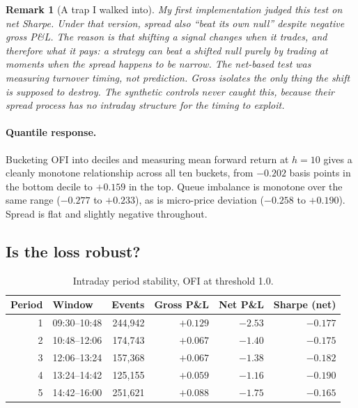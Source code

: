 \documentclass[11pt]{scrartcl}
\newtheorem{remark}{Remark}[section]
\begin{document}
\begin{remark}[A trap I walked into]
\label{rem:nulltrap}
My first implementation judged this test on \emph{net} Sharpe. Under that version, spread also ``beat its own null'' despite negative gross P\&L. The reason is that shifting a signal changes \emph{when} it trades, and therefore what it pays: a strategy can beat a shifted null purely by trading at moments when the spread happens to be narrow. The net-based test was measuring turnover timing, not prediction. Gross isolates the only thing the shift is supposed to destroy. The synthetic controls never caught this, because their spread process has no intraday structure for the timing to exploit.
\end{remark}

\paragraph{Quantile response.} Bucketing OFI into deciles and measuring mean forward return at $h=10$ gives a cleanly monotone relationship across all ten buckets, from $-0.202$ basis points in the bottom decile to $+0.159$ in the top. Queue imbalance is monotone over the same range ($-0.277$ to $+0.233$), as is micro-price deviation ($-0.258$ to $+0.190$). Spread is flat and slightly negative throughout.

\subsection{Is the loss robust?}
\label{sec:isrobust}

\begin{table}[H]
\centering
\caption{Intraday period stability, OFI at threshold 1.0.}
\label{tab:periods}
\begin{tabular}{rlrrrr}
\toprule
Period & Window & Events & Gross P\&L & Net P\&L & Sharpe (net) \\
\midrule
1 & 09:30--10:48 & 244{,}942 & $+0.129$ & $-2.53$ & $-0.177$ \\
2 & 10:48--12:06 & 174{,}743 & $+0.067$ & $-1.40$ & $-0.175$ \\
3 & 12:06--13:24 & 157{,}368 & $+0.067$ & $-1.38$ & $-0.182$ \\
4 & 13:24--14:42 & 125{,}155 & $+0.059$ & $-1.16$ & $-0.190$ \\
5 & 14:42--16:00 & 251{,}621 & $+0.088$ & $-1.75$ & $-0.165$ \\
\bottomrule
\end{tabular}
\end{table}
\end{document}
